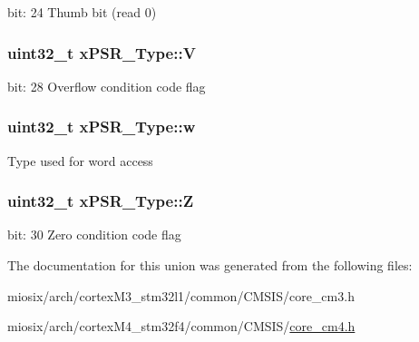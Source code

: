 bit\-: 24 Thumb bit (read 0) \hypertarget{unionx_p_s_r___type_af14df16ea0690070c45b95f2116b7a0a}{
\subsubsection[{V}]{\setlength{\rightskip}{0pt plus 5cm}uint32\-\_\-t x\-P\-S\-R\-\_\-\-Type\-::\-V}}\label{unionx_p_s_r___type_af14df16ea0690070c45b95f2116b7a0a}
bit\-: 28 Overflow condition code flag \hypertarget{unionx_p_s_r___type_a1a47176768f45f79076c4f5b1b534bc2}{
\subsubsection[{w}]{\setlength{\rightskip}{0pt plus 5cm}uint32\-\_\-t x\-P\-S\-R\-\_\-\-Type\-::w}}\label{unionx_p_s_r___type_a1a47176768f45f79076c4f5b1b534bc2}
Type used for word access \hypertarget{unionx_p_s_r___type_a1e5d9801013d5146f2e02d9b7b3da562}{
\subsubsection[{Z}]{\setlength{\rightskip}{0pt plus 5cm}uint32\-\_\-t x\-P\-S\-R\-\_\-\-Type\-::\-Z}}\label{unionx_p_s_r___type_a1e5d9801013d5146f2e02d9b7b3da562}
bit\-: 30 Zero condition code flag 

The documentation for this union was generated from the following files\-:\begin{DoxyCompactItemize}
\item 
miosix/arch/cortex\-M3\-\_\-stm32l1/common/\-C\-M\-S\-I\-S/core\-\_\-cm3.\-h\item 
miosix/arch/cortex\-M4\-\_\-stm32f4/common/\-C\-M\-S\-I\-S/\hyperlink{core__cm4_8h}{core\-\_\-cm4.\-h}\end{DoxyCompactItemize}
